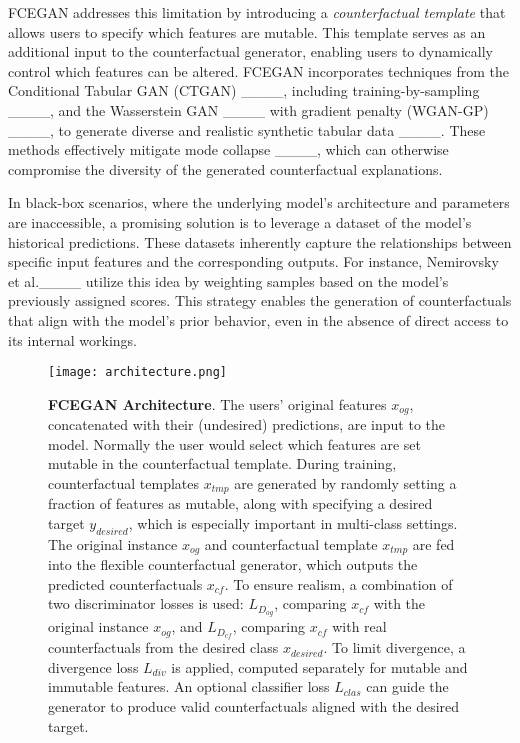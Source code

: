 FCEGAN addresses this limitation by introducing a \textit{counterfactual template} that allows users to specify which features are mutable. This template serves as an additional input to the counterfactual generator, enabling users to dynamically control which features can be altered. FCEGAN incorporates techniques from the Conditional Tabular GAN (CTGAN) ____, including training-by-sampling ____, and the Wasserstein GAN ____ with gradient penalty (WGAN-GP) ____, to generate diverse and realistic synthetic tabular data ____. These methods effectively mitigate mode collapse ____, which can otherwise compromise the diversity of the generated counterfactual explanations.

In black-box scenarios, where the underlying model's architecture and parameters are inaccessible, a promising solution is to leverage a dataset of the model's historical predictions. These datasets inherently capture the relationships between specific input features and the corresponding outputs. For instance, Nemirovsky et al.____ utilize this idea by weighting samples based on the model's previously assigned scores. This strategy enables the generation of counterfactuals that align with the model's prior behavior, even in the absence of direct access to its internal workings.

\begin{figure}[t!]
    \centering
    \texttt{[image: architecture.png]}
    \caption{\textbf{FCEGAN Architecture}. The users' original features \(x_{og}\), concatenated with their (undesired) predictions, are input to the model. Normally the user would select which features are set mutable in the counterfactual template. During training, counterfactual templates \( x_{tmp} \) are generated by randomly setting a fraction of features as mutable, along with specifying a desired target \( y_{desired} \), which is especially important in multi-class settings. The original instance \( x_{og} \) and counterfactual template \( x_{tmp} \) are fed into the flexible counterfactual generator, which outputs the predicted counterfactuals \( x_{cf} \). To ensure realism, a combination of two discriminator losses is used: \( L_{D_{og}} \), comparing \( x_{cf} \) with the original instance \( x_{og} \), and \( L_{D_{cf}} \), comparing \( x_{cf} \) with real counterfactuals from the desired class \( x_{desired} \). To limit divergence, a divergence loss \( L_{div} \) is applied, computed separately for mutable and immutable features. An optional classifier loss \( L_{clas} \) can guide the generator to produce valid counterfactuals aligned with the desired target.}
    \label{fig:architecture}
\end{figure}